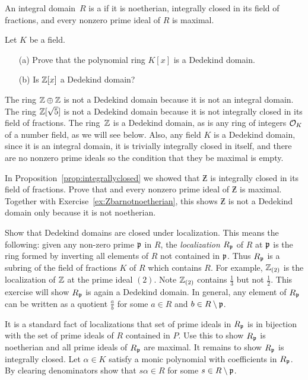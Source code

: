 \begin{definition}
An integral domain~$R$ is a  if it is noetherian,
integrally closed in its field of fractions, and every nonzero prime
ideal of $R$ is maximal.
\end{definition}

\begin{exercise}
Let $K$ be a field.
\begin{enumerate}
\item[(a)] Prove that the polynomial ring $K[x]$ is a Dedekind domain.
\item[(b)] Is $\mathbb{Z}[x]$ a Dedekind domain?
\end{enumerate}
\end{exercise}

The ring $\mathbb{Z}\oplus \mathbb{Z}$ is not a Dedekind domain because it is not an
integral domain.  The ring $\mathbb{Z}[\sqrt{5}]$ is not a Dedekind domain
because it is not integrally closed in its field of fractions.  The
ring~$\mathbb{Z}$ is a Dedekind domain, as is any ring of integers $\mathcal{O}_K$ of a
number field, as we will see below.  Also, any field $K$ is a Dedekind
domain, since it is an integral domain, it is trivially integrally
closed in itself, and there are no nonzero prime ideals so the
condition that they be maximal is empty.

\begin{exercise}
	In Proposition~\ref{prop:integrallyclosed} we showed
	that $\Zbar$ is integrally closed in its field of fractions.
	Prove that and every nonzero prime ideal of $\Zbar$
	is maximal. Together with Exercise~\ref{ex:Zbarnotnoetherian},
	this shows $\Zbar$ is not a Dedekind domain only because it
	is not noetherian.
\end{exercise}

\begin{exercise*}\label{ex:dedekindlocal}
	Show that Dedekind domains are closed under
	localization. This means the following: given
	any non-zero prime $\mathfrak{p}$ in $R$, the \emph{localization}
	$R_{\mathfrak{p}}$ of $R$ at $\mathfrak{p}$ is the ring formed by inverting all
	elements of $R$ not contained in $\mathfrak{p}$. Thus $R_{\mathfrak{p}}$ is a
	subring of the field of fractions $K$ of $R$ which contains
	$R$. For example, $\mathbb{Z}_{(2)}$ is the localization of $\mathbb{Z}$
	at the prime ideal $(2)$. Note $\mathbb{Z}_{(2)}$ contains
	$\frac{1}{3}$ but not $\frac{1}{2}$.
	This exercise will show $R_{\mathfrak{p}}$ is again a Dedekind domain.
	In general, any element of $R_{\mathfrak{p}}$ can be written as a quotient
	$\frac{a}{b}$ for some $a\in R$ and $b\in R\setminus \mathfrak{p}$.
	
	\begin{hint}
		It is a standard fact of localizations that
		set of prime ideals in $R_{\mathfrak{p}}$ is in bijection with the set
		of prime ideals of $R$ contained in $P$. Use this to show
		$R_{\mathfrak{p}}$ is noetherian and all prime ideals of $R_{\mathfrak{p}}$ are maximal.
		It remains to show $R_{\mathfrak{p}}$ is integrally closed. Let $\alpha\in K$
		satisfy a monic polynomial with coefficients in $R_{\mathfrak{p}}$. By
		clearing denominators show that $s\alpha\in R$ for some
		$s\in R\setminus \mathfrak{p}$.
	\end{hint}
\end{exercise*}

